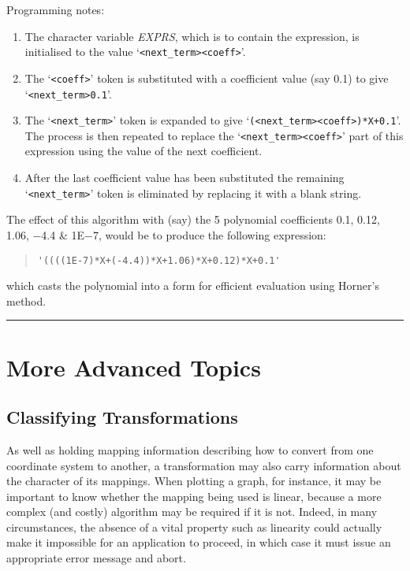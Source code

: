 \documentclass[twoside,11pt]{article}
\newcommand{\xlabel}[1]{}
\newcommand{\fortvar}[1]{\mbox{\emph{#1}}}
\newcommand{\exampledone}[0]{\begin{center} \rule{6em}{0.2mm} \end{center}}
\begin{document}
Programming notes:

\begin{enumerate}

\item The character variable \fortvar{EXPRS}, which is to contain the 
expression, is initialised to the value `\verb#<next_term><coeff>#'. 

\item The `\verb#<coeff>#' token is substituted with a coefficient
value (say 0.1) to give `\verb#<next_term>0.1#'.

\item The `\verb#<next_term>#' token is expanded to give
`\verb#(<next_term><coeff>)*X+0.1#'. 
The process is then repeated to replace the `\verb#<next_term><coeff>#'
part of this expression using the value of the next coefficient.

\item After the last coefficient value has been substituted the remaining
`\verb#<next_term>#' token is eliminated by replacing it with a blank
string. 

\end{enumerate}

The effect of this algorithm with (say) the 5 polynomial coefficients 0.1,
0.12, 1.06, $-$4.4 \& 1E$-$7, would be to produce the following expression:

\begin{quote}
\begin{verbatim}
'((((1E-7)*X+(-4.4))*X+1.06)*X+0.12)*X+0.1'
\end{verbatim}
\end{quote}

which casts the polynomial into a form for efficient evaluation using
Horner's method. 
\exampledone


\section{\xlabel{more_advanced_topics}More Advanced Topics}


\subsection{\xlabel{classifying_transformations}Classifying Transformations}

\label{section:advanced:classification}

As well as holding mapping information describing how to convert from one
coordinate system to another, a transformation may also carry information
about the character of its mappings. 
When plotting a graph, for instance, it may be important to know whether the
mapping being used is linear, because a more complex (and costly) algorithm
may be required if it is not. 
Indeed, in many circumstances, the absence of a vital property such as
linearity could actually make it impossible for an application to proceed,
in which case it must issue an appropriate error message and abort. 
\end{document}
